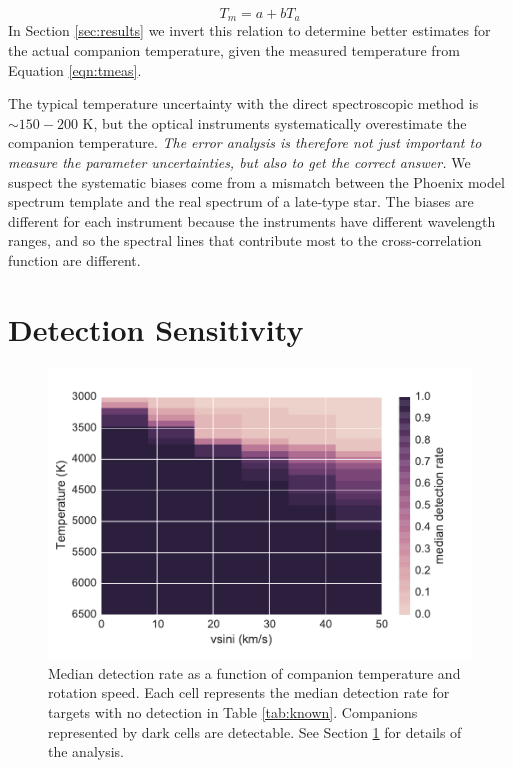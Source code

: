 \documentclass{emulateapj}
\begin{document}
\begin{equation}
T_m = a + bT_a
\end{equation}
In Section \ref{sec:results} we invert this relation to determine better estimates for the actual companion temperature, given the measured temperature from Equation \ref{eqn:tmeas}.

The typical temperature uncertainty with the direct spectroscopic method is $\sim 150 - 200$ K, but the optical instruments systematically overestimate the companion temperature. \emph{The error analysis is therefore not just important to measure the parameter uncertainties, but also to get the correct answer.} We suspect the systematic biases come from a mismatch between the Phoenix model spectrum template and the real spectrum of a late-type star. The biases are different for each instrument because the instruments have different wavelength ranges, and so the spectral lines that contribute most to the cross-correlation function are different. 



\section{Detection Sensitivity}
\label{subsec:sensitivity}



\begin{figure}
  \centering
  \includegraphics[width=\columnwidth]{vsini_temperature_detection_rate_median.pdf}
  \caption{Median detection rate as a function of companion temperature and rotation speed. Each cell represents the median detection rate for targets with no detection in Table \ref{tab:known}. Companions represented by dark cells are detectable. See Section \ref{subsec:sensitivity} for details of the analysis.}
  \label{fig:sensitivity_2d}
\end{figure}
\end{document}
